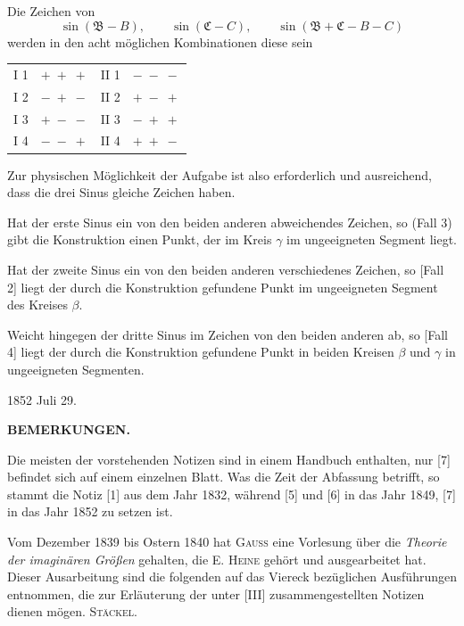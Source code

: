 
Die Zeichen von
\[ \sin(\mathfrak{B}-B), \qquad \sin(\mathfrak{C}-C), \qquad \sin(\mathfrak{B}+\mathfrak{C}-B-C) \]
werden in den acht möglichen Kombinationen diese sein

\begin{center}
\begin{tabular}{cc|cc}
I 1 & $+\;+\;+$ & II 1 & $-\;-\;-$ \\
I 2 & $-\;+\;-$ & II 2 & $+\;-\;+$ \\
I 3 & $+\;-\;-$ & II 3 & $-\;+\;+$ \\
I 4 & $-\;-\;+$ & II 4 & $+\;+\;-$ \\
\end{tabular}
\end{center}

Zur physischen Möglichkeit der Aufgabe ist also erforderlich und ausreichend, dass die drei Sinus gleiche Zeichen haben.

Hat der erste Sinus ein von den beiden anderen abweichendes Zeichen, so (Fall 3) gibt die Konstruktion einen Punkt, der im Kreis $\gamma$ im ungeeigneten Segment liegt.

Hat der zweite Sinus ein von den beiden anderen verschiedenes Zeichen, so [Fall 2] liegt der durch die Konstruktion gefundene Punkt im ungeeigneten Segment des Kreises $\beta$.

Weicht hingegen der dritte Sinus im Zeichen von den beiden anderen ab, so [Fall 4] liegt der durch die Konstruktion gefundene Punkt in beiden Kreisen $\beta$ und $\gamma$ in ungeeigneten Segmenten.

\hfill 1852 Juli 29.

\medskip

\begin{center}
\textbf{BEMERKUNGEN.}
\end{center}

Die meisten der vorstehenden Notizen sind in einem Handbuch enthalten, nur [7] befindet sich auf einem einzelnen Blatt. Was die Zeit der Abfassung betrifft, so stammt die Notiz [1] aus dem Jahr 1832, während [5] und [6] in das Jahr 1849, [7] in das Jahr 1852 zu setzen ist.

Vom Dezember 1839 bis Ostern 1840 hat \textsc{Gauss} eine Vorlesung über die \emph{Theorie der imaginären Größen} gehalten, die E. \textsc{Heine} gehört und ausgearbeitet hat. Dieser Ausarbeitung sind die folgenden auf das Viereck bezüglichen Ausführungen entnommen, die zur Erläuterung der unter [III] zusammengestellten Notizen dienen mögen. \hfill \textsc{Stäckel}.
